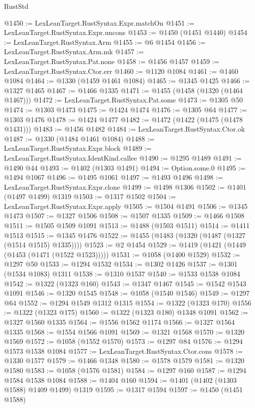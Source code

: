 \begin{lexlean}{RustStd}
\begin{coremodule}
@1450 := LexLeanTarget.RustSyntax.Expr.matchOn
@1451 := LexLeanTarget.RustSyntax.Expr.uncons
@1453 := @1450 (@1451 @1440)
@1454 := LexLeanTarget.RustSyntax.Arm
@1455 := @6 @1454
@1456 := LexLeanTarget.RustSyntax.Arm.mk
@1457 := LexLeanTarget.RustSyntax.Pat.none
@1458 := @1456 @1457
@1459 := LexLeanTarget.RustSyntax.Ctor.err
@1460 := @1120 @1084
@1461 := @1460 @1084
@1464 := @1330 (@1459 @1461 @1084)
@1465 := @1345 @1425
@1466 := @1327 @1465
@1467 := @1466 @1335
@1471 := @1455 (@1458 (@1320 (@1464 @1467)))
@1472 := LexLeanTarget.RustSyntax.Pat.some
@1473 := @1305 @50
@1474 := @1303 @1473
@1475 := @1424 @1474
@1476 := @1305 @64
@1477 := @1303 @1476
@1478 := @1424 @1477
@1482 := @1472 (@1422 (@1475 (@1478 @1431)))
@1483 := @1456 @1482
@1484 := LexLeanTarget.RustSyntax.Ctor.ok
@1487 := @1330 (@1484 @1461 @1084)
@1488 := LexLeanTarget.RustSyntax.Expr.block
@1489 := LexLeanTarget.RustSyntax.IdentKind.callee
@1490 := @1295 @1489
@1491 := @1490 @44
@1493 := @1402 (@1303 @1491)
@1494 := Option.some.{0}
@1495 := @1494 @1067
@1496 := @1495 @1061
@1497 := @1493 @1496
@1498 := LexLeanTarget.RustSyntax.Expr.clone
@1499 := @1498 @1306
@1502 := @1401 (@1497 @1499) @1319
@1503 := @1317 @1502
@1504 := LexLeanTarget.RustSyntax.Expr.apply
@1505 := @1504 @1491
@1506 := @1345 @1473
@1507 := @1327 @1506
@1508 := @1507 @1335
@1509 := @1466 @1508
@1511 := @1505 @1509 @1091
@1513 := @1488 (@1503 @1511)
@1514 := @1411 @1513
@1515 := @1345 @1476
@1522 := @1455 (@1483 (@1320 (@1487 (@1327 (@1514 @1515) @1335))))
@1523 := @2 @1454
@1529 := @1419 (@1421 (@1449 (@1453 (@1471 (@1522 @1523)))))
@1531 := @1058 (@1400 @1529)
@1532 := @1297 @50
@1533 := @1294 @1532
@1534 := @1302 @1426
@1537 := @1301 (@1534 @1083) @1311
@1538 := @1310 @1537
@1540 := @1533 @1538 @1084
@1542 := @1322 (@1323 @160)
@1543 := @1347 @1467
@1545 := @1542 @1543 @1091
@1546 := @1320 @1545
@1548 := @1058 (@1540 @1546)
@1549 := @1297 @64
@1552 := @1294 @1549 @1312 @1315
@1554 := @1322 (@1323 @170)
@1556 := @1322 (@1323 @175)
@1560 := @1322 (@1323 @180) @1348 @1091
@1562 := @1327 @1560 @1335
@1564 := @1556 @1562 @1174
@1566 := @1327 @1564 @1335
@1568 := @1554 @1566 @1091
@1569 := @1321 @1568
@1570 := @1320 @1569
@1572 := @1058 (@1552 @1570)
@1573 := @1297 @84
@1576 := @1294 @1573 @1538 @1084
@1577 := LexLeanTarget.RustSyntax.Ctor.cons
@1578 := @1330 @1577
@1579 := @1466 @1348
@1580 := @1578 @1579
@1581 := @1320 @1580
@1583 := @1058 (@1576 @1581)
@1584 := @1297 @160
@1587 := @1294 @1584 @1538 @1084
@1588 := @1404 @160
@1594 := @1401 (@1402 (@1303 @1588) @1409 @1499) @1319
@1595 := @1317 @1594
@1597 := @1450 (@1451 @1588)

\end{coremodule}
\end{lexlean}
